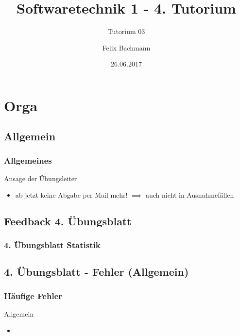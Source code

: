 \documentclass[18pt]{beamer}
\title[SWT1]{Softwaretechnik 1 - 4. Tutorium}
\subtitle{Tutorium 03}
\author{Felix Bachmann}
\date{26.06.2017}
\institute{KIT - Institut für Programmstrukturen und Datenorganisation (IPD)}
\begin{document}

\begin{frame}
\titlepage
\end{frame}

\begin{frame}
\tableofcontents
\end{frame}


\section{Orga}

	\subsection{Allgemein}
	\begin{frame}
		\frametitle{Allgemeines}
		\begin{alertblock}{Ansage der Übungsleiter}
			\begin{itemize}
				\item ab jetzt keine Abgabe per Mail mehr!
				\linebreak $\implies$ auch nicht in Ausnahmefällen
			\end{itemize}
		\end{alertblock}
	\end{frame}

	\subsection{Feedback 4. Übungsblatt}
	\begin{frame}
		\frametitle{4. Übungsblatt Statistik}
	\end{frame}
	
	\subsection{4. Übungsblatt - Fehler (Allgemein)}
	\begin{frame}
		\frametitle{Häufige Fehler}
		\begin{block}{Allgemein}
			\begin{itemize}
				\item %
			\end{itemize}
		\end{block}
	\end{frame}
	
\end{document}
